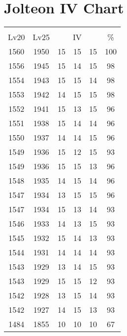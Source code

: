 \documentclass{article}%
\begin{document}
%
\normalsize%
\section{Jolteon IV Chart}%
\label{sec:Jolteon IV Chart}%
\renewcommand{\arraystretch}{1.5}%
\begin{tabular}{|c|c|c|c|c|c|}%
\hline%
\multicolumn{6}{|c|}{\textcolor{white}{ 
\linebreak{Jolteon}
}%
\cellcolor{black}}\\%
\multicolumn{1}{|c}{Lv20}&\multicolumn{1}{c|}{Lv25}&\multicolumn{3}{c|}{IV}&\multicolumn{1}{|c|}{\%}\\%
\hline%
\rowcolor{color100}%
1560&1950&15&15&15&100\\%
\hline%
\rowcolor{color98}%
1556&1945&15&14&15&98\\%
\hline%
\rowcolor{color98}%
1554&1943&15&15&14&98\\%
\hline%
\rowcolor{color98}%
1553&1942&14&15&15&98\\%
\hline%
\rowcolor{color96}%
1552&1941&15&13&15&96\\%
\hline%
\rowcolor{color96}%
1551&1938&15&14&14&96\\%
\hline%
\rowcolor{color96}%
1550&1937&14&14&15&96\\%
\hline%
\rowcolor{color93}%
1549&1936&15&12&15&93\\%
\hline%
\rowcolor{color96}%
1549&1936&15&15&13&96\\%
\hline%
\rowcolor{color96}%
1548&1935&14&15&14&96\\%
\hline%
\rowcolor{color96}%
1547&1934&13&15&15&96\\%
\hline%
\rowcolor{color93}%
1547&1934&15&13&14&93\\%
\hline%
\rowcolor{color93}%
1546&1933&14&13&15&93\\%
\hline%
\rowcolor{color93}%
1545&1932&15&14&13&93\\%
\hline%
\rowcolor{color93}%
1544&1931&14&14&14&93\\%
\hline%
\rowcolor{color93}%
1543&1929&13&14&15&93\\%
\hline%
\rowcolor{color93}%
1543&1929&15&15&12&93\\%
\hline%
\rowcolor{color93}%
1542&1928&13&15&14&93\\%
\hline%
\rowcolor{color93}%
1542&1927&14&15&13&93\\%
\hline%
\rowcolor{color91}%
1484&1855&10&10&10&67\\%
\end{tabular}

%
\end{document}
